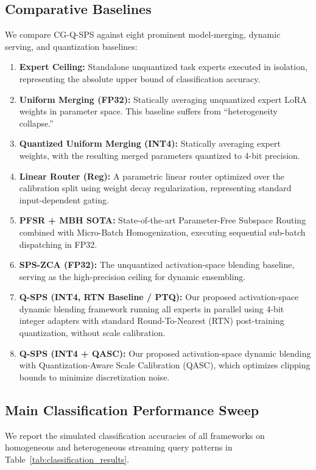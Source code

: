 \subsection{Comparative Baselines}
We compare CG-Q-SPS against eight prominent model-merging, dynamic serving, and quantization baselines:
\begin{enumerate}
  \item \textbf{Expert Ceiling:} Standalone unquantized task experts executed in isolation, representing the absolute upper bound of classification accuracy.
  \item \textbf{Uniform Merging (FP32):} Statically averaging unquantized expert LoRA weights in parameter space. This baseline suffers from ``heterogeneity collapse.''
  \item \textbf{Quantized Uniform Merging (INT4):} Statically averaging expert weights, with the resulting merged parameters quantized to 4-bit precision.
  \item \textbf{Linear Router (Reg):} A parametric linear router optimized over the calibration split using weight decay regularization, representing standard input-dependent gating.
  \item \textbf{PFSR + MBH SOTA:} State-of-the-art Parameter-Free Subspace Routing combined with Micro-Batch Homogenization, executing sequential sub-batch dispatching in FP32.
  \item \textbf{SPS-ZCA (FP32):} The unquantized activation-space blending baseline, serving as the high-precision ceiling for dynamic ensembling.
  \item \textbf{Q-SPS (INT4, RTN Baseline / PTQ):} Our proposed activation-space dynamic blending framework running all experts in parallel using 4-bit integer adapters with standard Round-To-Nearest (RTN) post-training quantization, without scale calibration.
  \item \textbf{Q-SPS (INT4 + QASC):} Our proposed activation-space dynamic blending with Quantization-Aware Scale Calibration (QASC), which optimizes clipping bounds to minimize discretization noise.
\end{enumerate}

\subsection{Main Classification Performance Sweep}
We report the simulated classification accuracies of all frameworks on homogeneous and heterogeneous streaming query patterns in Table~\ref{tab:classification_results}.

